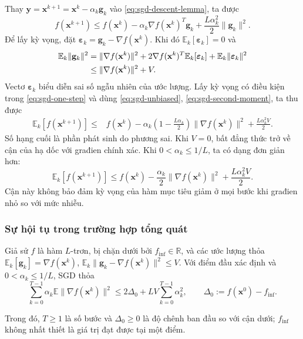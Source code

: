 Thay $\mathbf{y}=\mathbf{x}^{k+1}=\mathbf{x}^{k}-\alpha_k\mathbf{g}_k$
vào \eqref{eq:sgd-descent-lemma}, ta được
\begin{equation}
 f(\mathbf{x}^{k+1})\leq f(\mathbf{x}^{k})
 -\alpha_k\nabla f(\mathbf{x}^{k})^T\mathbf{g}_k
 +\frac{L\alpha_k^2}{2}\|\mathbf{g}_k\|^2.
 \label{eq:sgd-one-step}
\end{equation}
Để lấy kỳ vọng, đặt $\boldsymbol{\varepsilon}_k=
\mathbf{g}_k-\nabla f(\mathbf{x}^{k})$. Khi đó
$\mathbb{E}_k[\boldsymbol{\varepsilon}_k]=0$ và
\begin{align}
 \mathbb{E}_k\|\mathbf{g}_k\|^2
 &=\|\nabla f(\mathbf{x}^{k})\|^2
 +2\nabla f(\mathbf{x}^{k})^T\mathbb{E}_k[\boldsymbol{\varepsilon}_k]
 +\mathbb{E}_k\|\boldsymbol{\varepsilon}_k\|^2\notag\\
 &\leq\|\nabla f(\mathbf{x}^{k})\|^2+V.
 \label{eq:sgd-second-moment}
\end{align}
Vectơ $\boldsymbol{\varepsilon}_k$ biểu diễn sai số ngẫu nhiên của ước lượng. Lấy kỳ vọng có điều kiện trong \eqref{eq:sgd-one-step} và dùng
\eqref{eq:sgd-unbiased}, \eqref{eq:sgd-second-moment}, ta thu được
\begin{equation}
 \boxed{\begin{aligned}
 \mathbb{E}_k[f(\mathbf{x}^{k+1})]
 \leq{}& f(\mathbf{x}^{k})
 -\alpha_k\left(1-\frac{L\alpha_k}{2}\right)
           \|\nabla f(\mathbf{x}^{k})\|^2
 +\frac{L\alpha_k^2V}{2}.
 \end{aligned}}
 \label{eq:sgd-fundamental}
\end{equation}
Số hạng cuối là phần phát sinh do phương sai. Khi $V=0$, bất đẳng thức
trở về cận của hạ dốc với građien chính xác. Khi $0<\alpha_k\leq1/L$,
ta có dạng đơn giản hơn:
\begin{equation}
 \mathbb{E}_k[f(\mathbf{x}^{k+1})]
 \leq f(\mathbf{x}^{k})-\frac{\alpha_k}{2}
           \|\nabla f(\mathbf{x}^{k})\|^2
           +\frac{L\alpha_k^2V}{2}.
 \label{eq:sgd-fundamental-simple}
\end{equation}
Cận này không bảo đảm kỳ vọng của hàm mục tiêu giảm ở mọi bước khi
građien nhỏ so với mức nhiễu.

\subsubsection{Sự hội tụ trong trường hợp tổng quát}
\begin{theorem}\label{thm:sgd-nonconvex}
Giả sử $f$ là hàm $L$-trơn, bị chặn dưới bởi $f_{\inf}\in\mathbb{R}$,
và các ước lượng thỏa
$\mathbb{E}_k[\mathbf{g}_k]=\nabla f(\mathbf{x}^{k})$,
$\mathbb{E}_k\|\mathbf{g}_k-\nabla f(\mathbf{x}^{k})\|^2\leq V$.
Với điểm đầu xác định và $0<\alpha_k\leq1/L$, SGD thỏa
\begin{equation}
 \sum_{k=0}^{T-1}\alpha_k\mathbb{E}\|\nabla f(\mathbf{x}^{k})\|^2
 \leq 2\Delta_0+LV\sum_{k=0}^{T-1}\alpha_k^2,
 \qquad \Delta_0:=f(\mathbf{x}^{0})-f_{\inf}.
 \label{eq:sgd-weighted}
\end{equation}
\end{theorem}
Trong đó, $T\geq1$ là số bước và $\Delta_0\geq0$ là độ chênh ban đầu
so với cận dưới; $f_{\inf}$ không nhất thiết là giá trị đạt được tại một điểm.

